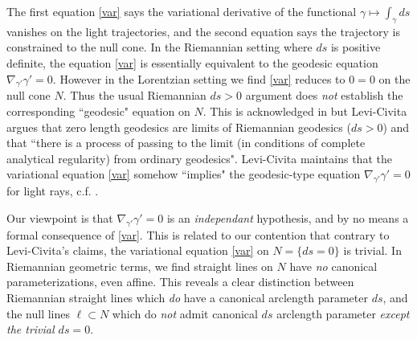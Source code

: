 \documentclass[12pt]{article}
\begin{document}
The first equation \eqref{var} says the variational derivative of the functional $\gamma \mapsto \int_\gamma ds$ vanishes on the light trajectories, and the second equation says the trajectory is constrained to the null cone. In the Riemannian setting where $ds$ is positive definite, the equation \eqref{var} is essentially equivalent to the geodesic equation $\nabla_{\gamma'} \gamma'=0$. However in the Lorentzian setting we find \eqref{var} reduces to $0=0$ on the null cone $N$. Thus the usual Riemannian $ds>0$ argument does \emph{not} establish the corresponding ``geodesic" equation on $N$. This is acknowledged in \cite[III.XI.14]{levi} but Levi-Civita argues that zero length geodesics are limits of Riemannian geodesics ($ds>0$) and that ``there is a process of passing to the limit (in conditions of complete analytical regularity) from ordinary geodesics". Levi-Civita maintains that the variational equation \eqref{var} somehow ``implies" the geodesic-type equation $\nabla_{\gamma'} \gamma'=0$ for light rays, c.f. \cite[III.XI.18]{levi}. 

Our viewpoint is that $\nabla_{\gamma'} \gamma'=0$ is an \emph{independant} hypothesis, and by no means a formal consequence of \eqref{var}. This is related to our contention that contrary to Levi-Civita's claims, the variational equation \eqref{var} on $N=\{ds=0\}$ is trivial. In Riemannian geometric terms,  we find straight lines on $N$ have \emph{no} canonical parameterizations, even affine. This reveals a clear distinction between Riemannian straight lines which \emph{do} have a canonical arclength parameter $ds$, and the null lines $\ell \subset N$ which do \emph{not} admit canonical $ds$ arclength parameter \emph{except the trivial $ds=0$}. 




\end{document}
